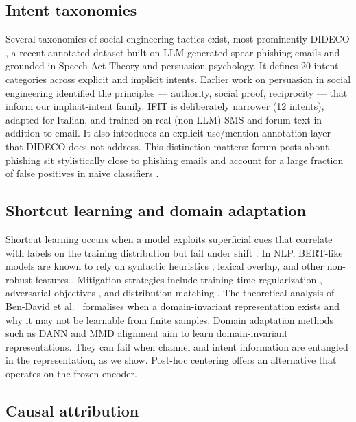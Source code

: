 \documentclass[preprint,12pt,authoryear]{elsarticle}
\begin{document}
\subsection{Intent taxonomies}

Several taxonomies of social-engineering tactics exist, most
prominently DIDECO \citep{popovic2026dideco}, a recent annotated
dataset built on LLM-generated spear-phishing emails and grounded in
Speech Act Theory and persuasion psychology. It defines 20 intent
categories across explicit and implicit intents. Earlier work on
persuasion in social engineering \citep{ferreira2015principles}
identified the principles --- authority, social proof, reciprocity
--- that inform our implicit-intent family. IFIT is deliberately
narrower (12 intents), adapted for Italian, and trained on real
(non-LLM) SMS and forum text in addition to email. It also
introduces an explicit use/mention annotation layer that DIDECO
does not address. This distinction matters: forum posts about
phishing sit stylistically close to phishing emails and account for
a large fraction of false positives in naive classifiers
\citep{gligoric2024use,wilson2010distinguishing}.

\subsection{Shortcut learning and domain adaptation}

Shortcut learning occurs when a model exploits superficial cues that
correlate with labels on the training distribution but fail under
shift \citep{geirhos2020shortcut,mccoy2019right}. In NLP, BERT-like
models are known to rely on syntactic heuristics
\citep{warstadt2020blimp}, lexical overlap, and other non-robust
features \citep{du2022shortcut}. Mitigation strategies include
training-time regularization \citep{du2022shortcut}, adversarial
objectives \citep{ganin2016domain}, and distribution matching
\citep{gretton2012mmd,long2015dan}. The theoretical analysis of
Ben-David et al.\ \citep{bendavid2006} formalises when a
domain-invariant representation exists and why it may not be
learnable from finite samples. Domain adaptation methods such
as DANN \citep{ganin2016domain} and MMD alignment
\citep{long2015dan,gretton2012mmd} aim to learn
domain-invariant representations. They can fail when channel and
intent information are entangled in the representation, as we show.
Post-hoc centering offers an alternative that operates on the frozen
encoder.

\subsection{Causal attribution}
\end{document}
